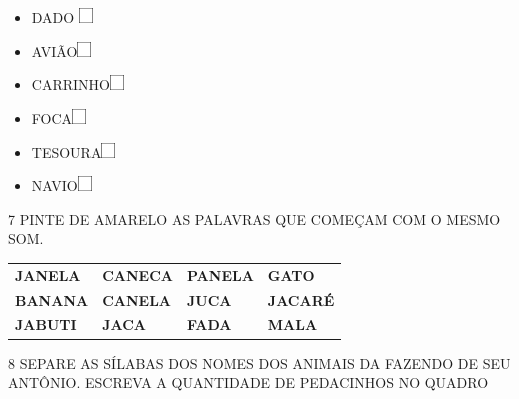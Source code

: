 \begin{itemize}
\item DADO \quad \includegraphics[width=1em]{media/image5.png}

\item AVIÃO\quad \includegraphics[width=1em]{media/image5.png}

\item CARRINHO\quad \includegraphics[width=1em]{media/image5.png}

\item FOCA\quad \includegraphics[width=1em]{media/image5.png}

\item TESOURA\quad \includegraphics[width=1em]{media/image5.png}

\item NAVIO\quad \includegraphics[width=1em]{media/image5.png}
\end{itemize}

\num{7} PINTE DE AMARELO AS PALAVRAS QUE COMEÇAM COM O MESMO SOM.


\begin{longtable}[]{@{}llll@{}}
\toprule
\textbf{JANELA} & \textbf{CANECA} & \textbf{PANELA} &
\textbf{GATO}\tabularnewline
\textbf{BANANA} & \textbf{CANELA} & \textbf{JUCA} &
\textbf{JACARÉ}\tabularnewline
\textbf{JABUTI} & \textbf{JACA} & \textbf{FADA} &
\textbf{MALA}\tabularnewline
\bottomrule
\end{longtable}

\num{8} SEPARE AS SÍLABAS DOS NOMES DOS ANIMAIS
DA FAZENDO DE SEU ANTÔNIO. ESCREVA A QUANTIDADE DE PEDACINHOS NO
QUADRO



